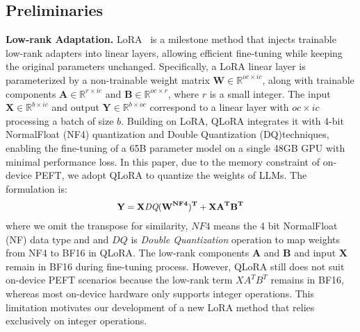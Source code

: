 \subsection{Preliminaries}
\label{sec: background}

\noindent\textbf{Low-rank Adaptation.} LoRA~\cite{hu2021lora} is a milestone method that injects trainable low-rank adapters into linear layers, allowing efficient fine-tuning while keeping the original parameters unchanged. Specifically, a LoRA linear layer is parameterized by a non-trainable weight matrix $\mathbf{W}\in\mathbb{R}^{oc\times ic}$, along with trainable components $\mathbf{A} \in\mathbb{R}^{r\times ic}$ and $\mathbf{B} \in\mathbb{R}^{oc\times r}$, where $r$ is a small integer. The input $\mathbf{X} \in \mathbb{R}^{b \times ic}$ and output $\mathbf{Y} \in \mathbb{R}^{b \times oc}$ correspond to a linear layer with $oc\times ic$ processing a batch of size $b$. Building on LoRA, QLoRA integrates it with 4-bit NormalFloat (NF4) quantization and Double Quantization (DQ)techniques, enabling the fine-tuning of a 65B parameter model on a single 48GB GPU with minimal performance loss. In this paper, due to the memory constraint of on-device PEFT, we adopt QLoRA to quantize the weights of LLMs. The formulation is:
\begin{equation*}
\small
\begin{aligned}
\vspace{-5mm}
    \label{eq:peft-qlora}
    \mathbf{Y = X \textit{DQ}(W^{NF4})^T + X A^T B^T}
\vspace{-5mm}
\end{aligned}
\end{equation*}
where we omit the transpose for similarity, $NF4$ means the 4 bit NormalFloat (NF) data type and and $DQ$ is \textit{Double Quantization} operation to map weights from NF4 to BF16 in QLoRA. The low-rank components $\mathbf{A}$ and $\mathbf{B}$ and input $\mathbf{X}$ remain in BF16 during fine-tuning process. However, QLoRA still does not suit on-device PEFT scenarios because the low-rank term $X A^T B^T$ remains in BF16, whereas most on-device hardware only supports integer operations. This limitation motivates our development of a new LoRA method that relies exclusively on integer operations.

